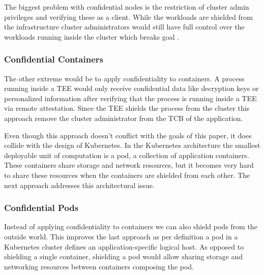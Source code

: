 The biggest problem with confidential nodes is the restriction of cluster admin
privileges and verifying these as a client. While the workloads are shielded
from the infrastructure cluster administrators would still have full control
over the workloads running inside the cluster which breaks goal
.

\subsubsection{Confidential Containers}

The other extreme would be to apply confidentiality to containers. A process
running inside a TEE would only receive confidential data like decryption keys
or personalized information after verifying that the process is running inside a
TEE via remote attestation. Since the TEE shields the process from the cluster
this approach remove the cluster administrator from the TCB of the application.

Even though this approach doesn't conflict with the goals of this paper, it does
collide with the design of Kubernetes. In the Kubernetes architecture the
smallest deployable unit of computation is a pod, a collection of application
containers. These containers share storage and network resources, but it becomes
very hard to share these resources when the containers are shielded from each
other. The next approach addresses this architectural issue.

\subsubsection{Confidential Pods}
\label{sec:confidential-applications}

Instead of applying confidentiality to containers we can also shield pods from
the outside world. This improves the last approach as per definition a pod in a
Kubernetes cluster defines an application-specific logical host. As opposed to
shielding a single container, shielding a pod would allow sharing storage and
networking resources between containers composing the pod.
